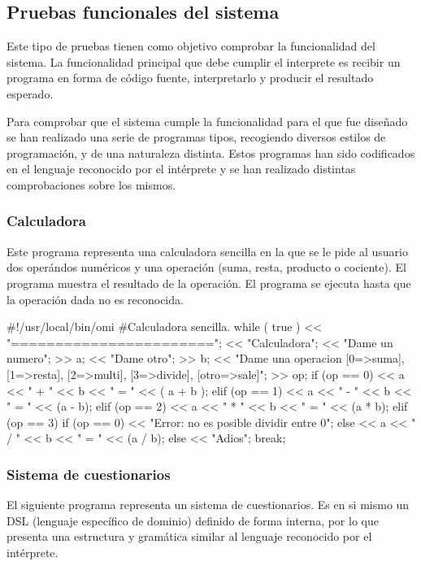 \subsection{Pruebas funcionales del sistema}
Este tipo de pruebas tienen como objetivo comprobar la funcionalidad del sistema. La funcionalidad principal que debe cumplir el interprete 
es recibir un programa en forma de código fuente, interpretarlo y producir el resultado esperado.

Para comprobar que el sistema cumple la funcionalidad para el que fue diseñado se han realizado una serie de programas tipos, recogiendo diversos estilos de 
programación, y de una naturaleza distinta. Estos programas han sido codificados en el lenguaje reconocido por el intérprete y se han realizado distintas comprobaciones 
sobre los mismos.

\subsubsection{Calculadora}
Este programa representa una calculadora sencilla en la que se le pide al usuario dos operándos numéricos y una operación (suma, resta, producto o cociente). El 
programa muestra el resultado de la operación. El programa se ejecuta hasta que la operación dada no es reconocida. \\

\begin{myverbatim}
#!/usr/local/bin/omi
#Calculadora sencilla.
while ( true ) {
   << "=======================";
   << "Calculadora";
   << "Dame un numero";
   >> a;
   << "Dame otro";
   >> b;
   << "Dame una operacion [0=>suma], [1=>resta], [2=>multi], [3=>divide], [otro=>sale]"; 
   >> op;
   if (op == 0) 
      << a << " + " << b << " = " << ( a + b ); 
   elif (op == 1) 
      << a << " - " << b << " = " << (a - b);
   elif (op == 2) 
      << a << " * " << b << " = " << (a * b);
   elif (op == 3) {
      if (op == 0)
         << "Error: no es posible dividir entre 0";
      else 
         << a << " / " << b << " = " << (a / b);
   }
   else {
      << "Adios";
      break;
   }
}
\end{myverbatim}

\subsubsection{Sistema de cuestionarios}
El siguiente programa representa un sistema de cuestionarios. Es en si mismo un DSL (lenguaje específico de dominio) definido de forma 
interna, por lo que presenta una estructura y gramática similar al lenguaje reconocido por el intérprete. 

